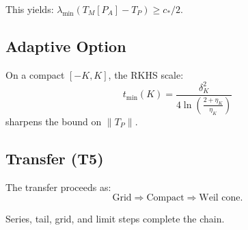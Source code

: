 This yields: $\lambda_{\min}(T_M[P_A] - T_P) \geq c_*/2$.

\subsection{Adaptive Option}

On a compact $[-K, K]$, the RKHS scale:
\begin{equation}
  t_{\min}(K) = \frac{\delta_K^2}{4 \ln\left(\frac{2 + \eta_K}{\eta_K}\right)}
\end{equation}
sharpens the bound on $\|T_P\|$.

\subsection{Transfer (T5)}

The transfer proceeds as:
\begin{equation}
  \text{Grid} \Rightarrow \text{Compact} \Rightarrow \text{Weil cone}.
\end{equation}

Series, tail, grid, and limit steps complete the chain.
